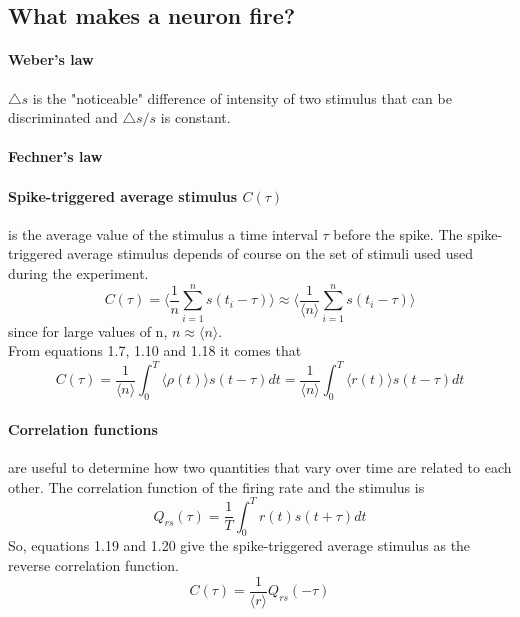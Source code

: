 \documentclass{report}
\begin{document}
\subsection{What makes a neuron fire?}
\paragraph{Weber's law} $\triangle s$ is the "noticeable" difference of intensity of two stimulus that can be discriminated and $\triangle s/s$ is constant. 
\paragraph{Fechner's law}
\paragraph{Spike-triggered average stimulus $C(\tau)$} is the average value of the stimulus a time interval $\tau$ before the spike. The spike-triggered average stimulus depends of course on the set of stimuli used used during the experiment. 
\begin{equation}
C(\tau) = \langle \frac{1}{n}\sum_{i=1}^{n}s(t_{i}-\tau) \rangle \approx \langle \frac{1}{\langle n \rangle}\sum_{i=1}^{n}s(t_{i}-\tau) \rangle
\end{equation}
since for large values of n, $n \approx \langle n \rangle $.
\\From equations 1.7, 1.10 and 1.18 it comes that
\begin{equation}
C(\tau)= \frac{1}{\langle n \rangle}\int_{0}^{T}\langle \rho(t) \rangle s(t-\tau) dt = \frac{1}{\langle n \rangle}\int_{0}^{T}\langle r(t) \rangle s(t-\tau) dt
\end{equation}
\paragraph{Correlation functions} are useful to determine how two quantities that vary over time are related to each other. The correlation function of the firing rate and the stimulus is 
\begin{equation}
Q_{rs}(\tau) = \frac{1}{T}\int_{0}^{T}r(t)s(t+\tau) dt
\end{equation}
So, equations 1.19 and 1.20 give the spike-triggered average stimulus as the reverse correlation  function. 
\begin{equation}
C(\tau) = \frac{1}{\langle r \rangle}Q_{rs}(-\tau)
\end{equation}
\end{document}
